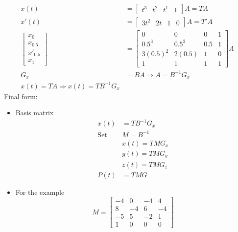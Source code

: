 \documentclass{article}
\begin{document}
\begin{align*}
    x(t) &= \begin{bmatrix}t^3 & t^2 & t^1 & 1\end{bmatrix}A = TA\\
    x'(t) &= \begin{bmatrix}3t^2 & 2t & 1 & 0\end{bmatrix}A = T'A\\
    \begin{bmatrix}x_0 \\ x_{0.5} \\ x'_{0.5} \\ x_1\end{bmatrix} &= \begin{bmatrix}0 & 0 & 0 & 1 \\ 0.5^3 & 0.5^2 & 0.5  & 1 \\ 3(0.5)^2 & 2(0.5) & 1 & 0 \\ 1 & 1 & 1 & 1\end{bmatrix}A\\
    G_x &= BA \Rightarrow A = B^{-1} G_x\\
    x(t) = TA \Rightarrow \boxed{x(t) = TB^{-1} G_x}
\end{align*}
Final form:
\begin{itemize}
    \item Basis matrix
        \begin{align*}
            x(t) &= TB^{-1} G_x \\
            \text{Set }&M = B^{-1}\\
            & x(t) = TMG_x\\
            & y(t) = TMG_y\\
            & z(t) = TMG_z\\
            P(t) &= TMG
        \end{align*}
    \item For the example
        \[M = \begin{bmatrix}-4 & 0 & -4 & 4 \\ 8 & -4 & 6 & -4 \\ -5 & 5 & -2 & 1 \\ 1 & 0 & 0 & 0\end{bmatrix}\]
\end{itemize}
\end{document}
